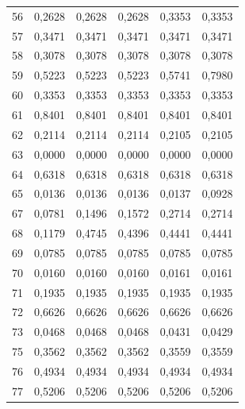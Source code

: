 \begin{center}
\begin{longtable}{c|r|r|r|r|r}
56 & 0,2628 & 0,2628 & 0,2628 & 0,3353 & 0,3353 \\

57 & 0,3471 & 0,3471 & 0,3471 & 0,3471 & 0,3471 \\

58 & 0,3078 & 0,3078 & 0,3078 & 0,3078 & 0,3078 \\

59 & 0,5223 & 0,5223 & 0,5223 & 0,5741 & 0,7980 \\

60 & 0,3353 & 0,3353 & 0,3353 & 0,3353 & 0,3353 \\

61 & 0,8401 & 0,8401 & 0,8401 & 0,8401 & 0,8401 \\

62 & 0,2114 & 0,2114 & 0,2114 & 0,2105 & 0,2105 \\

63 & 0,0000 & 0,0000 & 0,0000 & 0,0000 & 0,0000 \\

64 & 0,6318 & 0,6318 & 0,6318 & 0,6318 & 0,6318 \\

65 & 0,0136 & 0,0136 & 0,0136 & 0,0137 & 0,0928 \\

67 & 0,0781 & 0,1496 & 0,1572 & 0,2714 & 0,2714 \\

68 & 0,1179 & 0,4745 & 0,4396 & 0,4441 & 0,4441 \\

69 & 0,0785 & 0,0785 & 0,0785 & 0,0785 & 0,0785 \\

70 & 0,0160 & 0,0160 & 0,0160 & 0,0161 & 0,0161 \\

71 & 0,1935 & 0,1935 & 0,1935 & 0,1935 & 0,1935 \\

72 & 0,6626 & 0,6626 & 0,6626 & 0,6626 & 0,6626 \\

73 & 0,0468 & 0,0468 & 0,0468 & 0,0431 & 0,0429 \\

75 & 0,3562 & 0,3562 & 0,3562 & 0,3559 & 0,3559 \\

76 & 0,4934 & 0,4934 & 0,4934 & 0,4934 & 0,4934 \\

77 & 0,5206 & 0,5206 & 0,5206 & 0,5206 & 0,5206 \\


\end{longtable}
\end{center}
